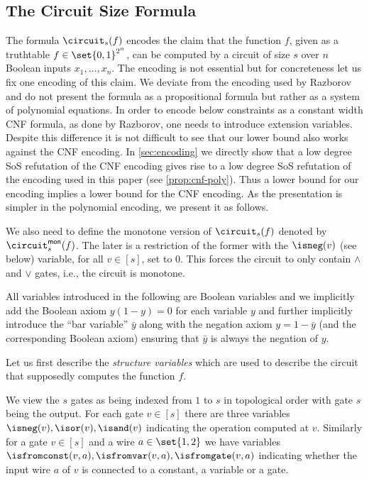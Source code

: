 \subsection{The Circuit Size Formula}
\label{sec:circuit-encoding}
The formula $\circuit_s(f)$ encodes the claim that the function $f$,
given as a truthtable $f \in \set{0, 1}^{2^n}$, can be computed by a
circuit of size $s$ over $n$ Boolean inputs $x_1, \ldots, x_n$. The
encoding is not essential but for concreteness let us fix one encoding
of this claim. We deviate from the encoding used by Razborov
\cite{Razborov98, Razborov04ResolutionLowerBoundsPM} and do not
present the formula as a propositional formula but rather as a system
of polynomial equations. In order to encode below constraints as a
constant width CNF formula, as done by Razborov, one needs to
introduce extension variables. Despite this difference it is not
difficult to see that our lower bound also works against the CNF
encoding. In \cref{sec:encoding} we directly show that a low degree
SoS refutation of the CNF encoding gives rise to a low degree SoS
refutation of the encoding used in this paper (see
\cref{prop:cnf-poly}). Thus a lower bound for our encoding implies a
lower bound for the CNF encoding. As the presentation is simpler in
the polynomial encoding, we present it as follows.

We also need to define the monotone version of $\circuit_s(f)$ denoted
by $\circuit^{\mathsf{mon}}_s(f)$. The later is a restriction of the
former with the $\isneg(v)$ (see below) variable, for all $v \in [s]$,
set to $0$. This forces the circuit to only contain $\land$ and $\lor$
gates, i.e., the circuit is monotone.

All variables introduced in the following are Boolean variables and we
implicitly add the Boolean axiom $y(1 - y) = 0$ for each variable $y$
and further implicitly introduce the ``bar variable'' $\bar{y}$ along
with the negation axiom $y = 1 - \bar{y}$ (and the corresponding
Boolean axiom) ensuring that $\bar{y}$ is always the negation of $y$.

Let us first describe the \emph{structure variables} which are used to
describe the circuit that supposedly computes the function $f$.

We view the $s$ gates as being indexed from $1$ to $s$ in topological
order with gate $s$ being the output.
For each gate $v \in [s]$ there are three variables $\isneg(v),
\isor(v), \isand(v)$ indicating the operation computed at
$v$. Similarly for a gate $v \in [s]$ and a wire $a \in \set{1,2}$ we
have variables $\isfromconst(v, a), \isfromvar(v, a), \isfromgate(v, a)$
indicating whether the input wire $a$ of $v$ is connected to a
constant, a variable or a gate.

